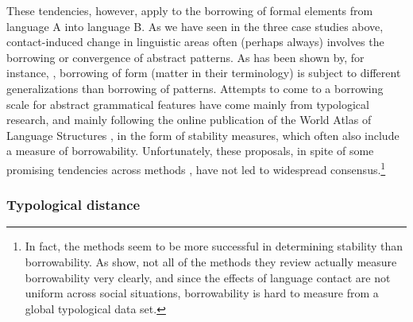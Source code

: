 \documentclass[output=paper]{langscibook}
\begin{document}
These tendencies, however, apply to the borrowing of formal elements from language A into language B. As we have seen in the three case studies above, contact-induced change in linguistic areas often (perhaps always) involves the borrowing or convergence of abstract patterns. As has been shown by, for instance, \textcite{matras&sakel2007}, borrowing of form (matter in their terminology) is subject to different generalizations than borrowing of patterns. Attempts to come to a borrowing scale for abstract grammatical features have come mainly from typological research, and mainly following the online publication of the World Atlas of Language Structures \parencite{wals}, in the form of stability measures, which often also include a measure of borrowability. Unfortunately, these proposals, in spite of some promising tendencies across methods \parencite{deduietal2013some}, have not led to widespread consensus.\footnote{In fact, the methods seem to be more successful in determining stability than borrowability. As \textcite[18]{deduietal2013some} show, not all of the methods they review actually measure borrowability very clearly, and since the effects of language contact are not uniform across social situations, borrowability is hard to measure from a global typological data set.}

\subsubsection{Typological distance}
\end{document}
